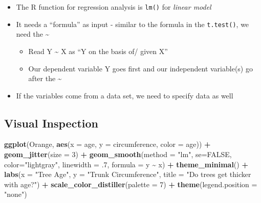 \documentclass[
]{book}
\newenvironment{Shaded}{\begin{snugshade}}{\end{snugshade}}
\newcommand{\AttributeTok}[1]{\textcolor[rgb]{0.13,0.29,0.53}{#1}}
\newcommand{\ConstantTok}[1]{\textcolor[rgb]{0.56,0.35,0.01}{#1}}
\newcommand{\DecValTok}[1]{\textcolor[rgb]{0.00,0.00,0.81}{#1}}
\newcommand{\FunctionTok}[1]{\textcolor[rgb]{0.13,0.29,0.53}{\textbf{#1}}}
\newcommand{\NormalTok}[1]{#1}
\newcommand{\SpecialCharTok}[1]{\textcolor[rgb]{0.81,0.36,0.00}{\textbf{#1}}}
\newcommand{\StringTok}[1]{\textcolor[rgb]{0.31,0.60,0.02}{#1}}
\providecommand{\tightlist}{%
  \setlength{\itemsep}{0pt}\setlength{\parskip}{0pt}}
\begin{document}
\begin{itemize}
\tightlist
\item
  The R function for regression analysis is \texttt{lm()} for \emph{linear model}
\item
  It needs a ``formula'' as input - similar to the formula in the \texttt{t.test()}, we need the \textasciitilde{}

  \begin{itemize}
  \tightlist
  \item
    Read Y \textasciitilde{} X as ``Y on the basis of/ given X''
  \item
    Our dependent variable Y goes first and our independent variable(s) go after the \textasciitilde{}
  \end{itemize}
\item
  If the variables come from a data set, we need to specify data as well
\end{itemize}

\subsection{Visual Inspection}\label{visual-inspection}

\begin{Shaded}
\begin{Highlighting}[]
\FunctionTok{ggplot}\NormalTok{(Orange, }\FunctionTok{aes}\NormalTok{(}\AttributeTok{x =}\NormalTok{ age, }\AttributeTok{y =}\NormalTok{ circumference, }\AttributeTok{color =}\NormalTok{ age)) }\SpecialCharTok{+} \FunctionTok{geom\_jitter}\NormalTok{(}\AttributeTok{size =} \DecValTok{3}\NormalTok{) }\SpecialCharTok{+}
  \FunctionTok{geom\_smooth}\NormalTok{(}\AttributeTok{method =} \StringTok{"lm"}\NormalTok{, }\AttributeTok{se=}\ConstantTok{FALSE}\NormalTok{, }\AttributeTok{color=}\StringTok{"lightgray"}\NormalTok{, }
              \AttributeTok{linewidth =}\NormalTok{ .}\DecValTok{7}\NormalTok{, }\AttributeTok{formula =}\NormalTok{ y }\SpecialCharTok{\textasciitilde{}}\NormalTok{ x) }\SpecialCharTok{+} \FunctionTok{theme\_minimal}\NormalTok{() }\SpecialCharTok{+} \FunctionTok{labs}\NormalTok{(}\AttributeTok{x =} \StringTok{"Tree Age"}\NormalTok{, }\AttributeTok{y =} \StringTok{"Trunk Circumference"}\NormalTok{, }\AttributeTok{title =} \StringTok{"Do trees get thicker with age?"}\NormalTok{) }\SpecialCharTok{+} \FunctionTok{scale\_color\_distiller}\NormalTok{(}\AttributeTok{palette =} \DecValTok{7}\NormalTok{) }\SpecialCharTok{+} \FunctionTok{theme}\NormalTok{(}\AttributeTok{legend.position =} \StringTok{"none"}\NormalTok{)}
\end{Highlighting}
\end{Shaded}
\end{document}
